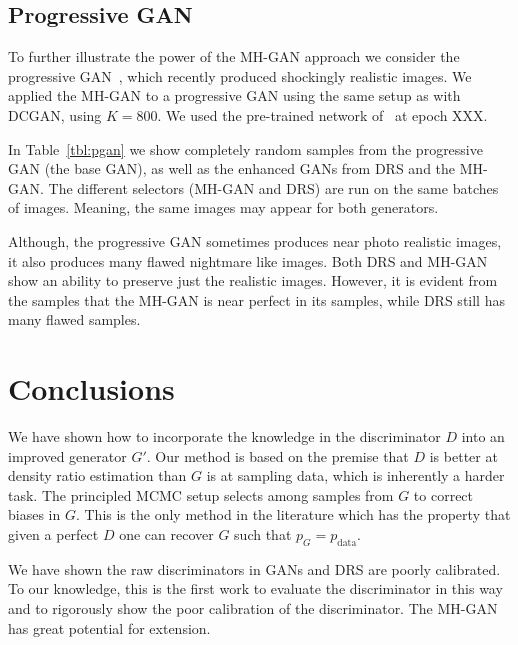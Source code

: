 \documentclass{article}
\newcommand{\PG}{{p_G}}
\newcommand{\PR}{{p_{\textrm{data}}}}
\begin{document}
\subsection{Progressive GAN}

To further illustrate the power of the MH-GAN approach we consider the progressive GAN~\citep{}, which recently produced shockingly realistic images.
We applied the MH-GAN to a progressive GAN using the same setup as with DCGAN, using $K=800$.
We used the pre-trained network of~\citet{} at epoch XXX.  %

In Table~\ref{tbl:pgan} we show completely random samples from the progressive GAN (the base GAN), as well as the enhanced GANs from DRS and the MH-GAN\@.
The different selectors (MH-GAN and DRS) are run on the same batches of images.
Meaning, the same images may appear for both generators.

Although, the progressive GAN sometimes produces near photo realistic images, it also produces many flawed nightmare like images.
Both DRS and MH-GAN show an ability to preserve just the realistic images.
However, it is evident from the samples that the MH-GAN is near perfect in its samples, while DRS still has many flawed samples.

\section{Conclusions}
\label{sec:conclusions}

We have shown how to incorporate the knowledge in the discriminator $D$ into an improved generator $G'$.
Our method is based on the premise that $D$ is better at density ratio estimation than $G$ is at sampling data, which is inherently a harder task.
The principled MCMC setup selects among samples from $G$ to correct biases in $G$.
This is the only method in the literature which has the property that given a perfect $D$ one can recover $G$ such that $\PG = \PR$.

We have shown the raw discriminators in GANs and DRS are poorly calibrated.
To our knowledge, this is the first work to evaluate the discriminator in this way and to rigorously show the poor calibration of the discriminator.
The MH-GAN has great potential for extension.

\end{document}
